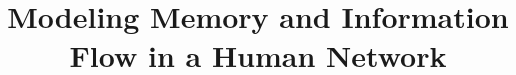 \documentclass[conference]{IEEEtran}
\begin{document}
%
\title{Modeling Memory and Information Flow in a Human Network}

\IEEEoverridecommandlockouts




%
\end{document}
